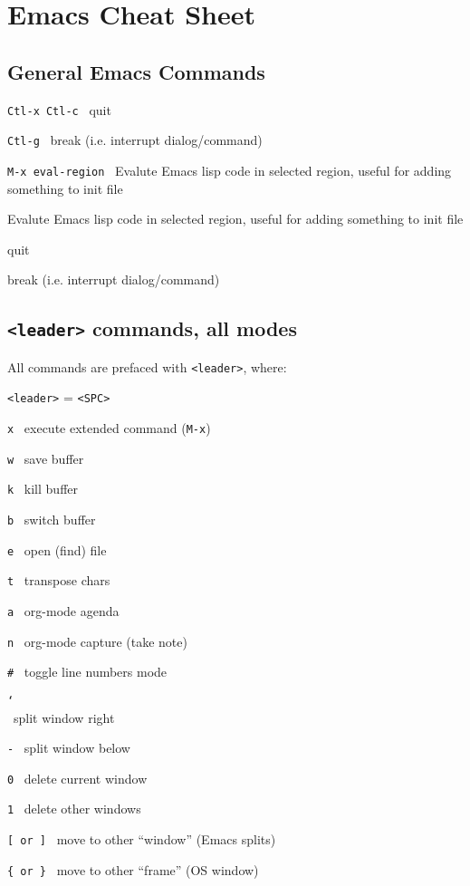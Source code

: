 \documentclass[fontsize=9pt,
                letterpaper,
                headings=normal,
                landscape]{scrartcl}
\let\olditem\item
\renewcommand\item[1][]{\olditem[{\texttt{#1}}] \raggedright \dotfill }}%
\newenvironment{commandlist}{\begin{description}[noitemsep]}{\end{description}}
\newcommand{\cm}[2]{\noindent\raggedright\texttt{#1} \dotfill\ #2 \newline}
\begin{document}
\section*{Emacs Cheat Sheet}


\begin{multicols*}{3}

\subsection*{General Emacs Commands}
\cm{Ctl-x Ctl-c}{quit}
\cm{Ctl-g}{break (i.e. interrupt dialog/command)}

\cm{M-x eval-region}{Evalute Emacs lisp code in selected region, useful for adding something to init file}

\begin{commandlist}

\item[M-x eval region] Evalute Emacs lisp code in selected region, useful for adding something to init file

\end{commandlist}


\begin{commandlist}
\item[Ctl-x Ctl-c] quit
\item[Ctl-g] break (i.e. interrupt dialog/command)
\end{commandlist}

\vspace*{\fill}
\columnbreak


\subsection*{\texttt{<leader>} commands, all modes}
All commands are prefaced with \texttt{<leader>}, where:
\begin{center}
\texttt{<leader>} = \texttt{<SPC>}
\end{center}

\cm{x}{execute extended command (\texttt{M-x})}
\cm{w}{save buffer}
\cm{k}{kill buffer}
\cm{b}{switch buffer}
\cm{e}{open (find) file}
\cm{t}{transpose chars}
\cm{a}{org-mode agenda}
\cm{n}{org-mode capture (take note)}
\cm{\#}{toggle line numbers mode}
\cm{\char`\\}{split window right}
\cm{-}{split window below}
\cm{0}{delete current window}
\cm{1}{delete other windows}
\cm{[ \textrm{or} ]}{move to other ``window'' (Emacs splits)}
\cm{\{ \textrm{or} \}}{move to other ``frame'' (OS window)}



\end{multicols*}
\end{document}
